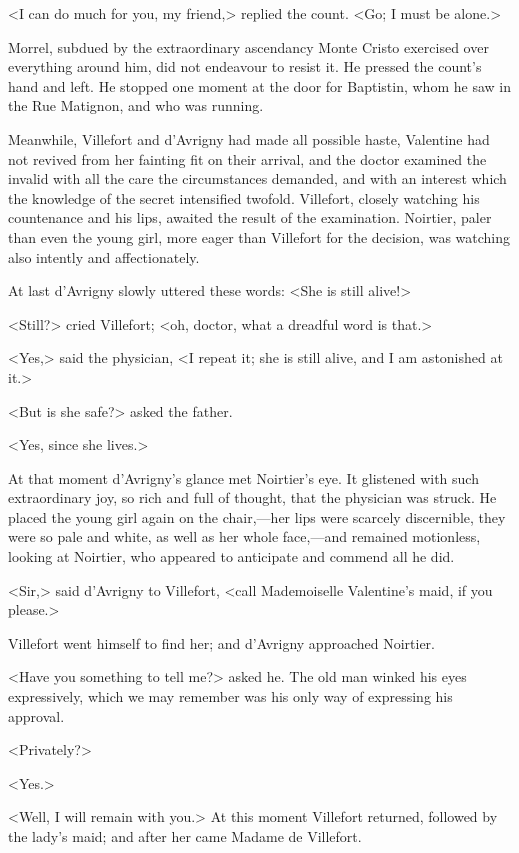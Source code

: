  <I can do much for you, my friend,> replied the count. <Go; I must be alone.> 

 Morrel, subdued by the extraordinary ascendancy Monte Cristo exercised over everything around him, did not endeavour to resist it. He pressed the count's hand and left. He stopped one moment at the door for Baptistin, whom he saw in the Rue Matignon, and who was running. 

 Meanwhile, Villefort and d'Avrigny had made all possible haste, Valentine had not revived from her fainting fit on their arrival, and the doctor examined the invalid with all the care the circumstances demanded, and with an interest which the knowledge of the secret intensified twofold. Villefort, closely watching his countenance and his lips, awaited the result of the examination. Noirtier, paler than even the young girl, more eager than Villefort for the decision, was watching also intently and affectionately. 

 At last d'Avrigny slowly uttered these words: <She is still alive!> 

 <Still?> cried Villefort; <oh, doctor, what a dreadful word is that.> 

 <Yes,> said the physician, <I repeat it; she is still alive, and I am astonished at it.> 

 <But is she safe?> asked the father. 

 <Yes, since she lives.> 

 At that moment d'Avrigny's glance met Noirtier's eye. It glistened with such extraordinary joy, so rich and full of thought, that the physician was struck. He placed the young girl again on the chair,—her lips were scarcely discernible, they were so pale and white, as well as her whole face,—and remained motionless, looking at Noirtier, who appeared to anticipate and commend all he did. 

 <Sir,> said d'Avrigny to Villefort, <call Mademoiselle Valentine's maid, if you please.> 

 Villefort went himself to find her; and d'Avrigny approached Noirtier. 

 <Have you something to tell me?> asked he. The old man winked his eyes expressively, which we may remember was his only way of expressing his approval. 

 <Privately?> 

 <Yes.> 

 <Well, I will remain with you.> At this moment Villefort returned, followed by the lady's maid; and after her came Madame de Villefort. 

